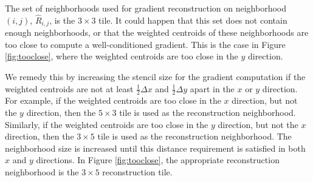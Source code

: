 The set of neighborhoods used for gradient reconstruction on neighborhood $(i,j)$, $\widehat R_{i,j}$, is the $3 \times 3$ tile.
It could happen that this set does not contain enough neighborhoods, or that the weighted centroids of these neighborhoods are too close to compute a well-conditioned gradient.
This is the case in Figure \ref{fig:tooclose}, where the weighted centroids are too close in the $y$ direction.

We remedy this by increasing the stencil size for the gradient computation if the weighted centroids are not at least $\frac{1}{2}\Delta x$  and $\frac{1}{2}\Delta y$ apart in the $x$ or $y$ direction.
For example, if the weighted centroids are too close in the $x$ 
direction, but not the $y$ direction, then the $5\times 3$ tile is used as the 
reconstruction neighborhood.  Similarly, if the weighted centroids are too 
close in the $y$ direction, but not the $x$ direction, then the $3\times 5$ tile is 
used as the reconstruction neighborhood.  The neighborhood size is increased until this distance requirement is satisfied in both $x$ and $y$ directions.  In Figure \ref{fig:tooclose},
the appropriate reconstruction neighborhood is the $3\times 5$ reconstruction tile.

